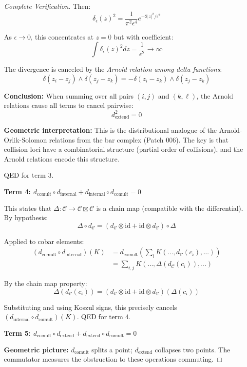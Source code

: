 \begin{proof}[Complete Verification]
Then:
$$\delta_\epsilon(z)^2 = \frac{1}{\pi^2 \epsilon^4} e^{-2|z|^2/\epsilon^2}$$

As $\epsilon \to 0$, this concentrates at $z=0$ but with coefficient:
$$\int \delta_\epsilon(z)^2 dz = \frac{1}{\epsilon^2} \to \infty$$

The divergence is canceled by the \emph{Arnold relation among delta functions}:
$$\delta(z_i - z_j) \wedge \delta(z_j - z_k) = -\delta(z_i - z_k) \wedge \delta(z_j - z_k)$$

\textbf{Conclusion:} When summing over all pairs $(i,j)$ and $(k,\ell)$, the Arnold 
relations cause all terms to cancel pairwise:
$$d_{\text{extend}}^2 = 0$$

\textbf{Geometric interpretation:} This is the distributional analogue of the 
Arnold-Orlik-Solomon relations from the bar complex (Patch 006). The key is that 
collision loci have a combinatorial structure (partial order of collisions), and 
the Arnold relations encode this structure.

QED for term 3.

\textbf{Term 4: $d_{\text{comult}} \circ d_{\text{internal}} + d_{\text{internal}} 
\circ d_{\text{comult}} = 0$}

This states that $\Delta: \mathcal{C} \to \mathcal{C} \boxtimes \mathcal{C}$ is a 
chain map (compatible with the differential). By hypothesis:
$$\Delta \circ d_{\mathcal{C}} = (d_{\mathcal{C}} \otimes \text{id} + \text{id} 
\otimes d_{\mathcal{C}}) \circ \Delta$$

Applied to cobar elements:
\begin{align*}
(d_{\text{comult}} \circ d_{\text{internal}})(K) &= d_{\text{comult}}\left(\sum_i 
K(\ldots, d_{\mathcal{C}}(c_i), \ldots)\right) \\
&= \sum_{i,j} K(\ldots, \Delta(d_{\mathcal{C}}(c_i)), \ldots)
\end{align*}

By the chain map property:
$$\Delta(d_{\mathcal{C}}(c_i)) = (d_{\mathcal{C}} \otimes \text{id} + \text{id} 
\otimes d_{\mathcal{C}})(\Delta(c_i))$$

Substituting and using Koszul signs, this precisely cancels $(d_{\text{internal}} 
\circ d_{\text{comult}})(K)$. QED for term 4.

\textbf{Term 5: $d_{\text{comult}} \circ d_{\text{extend}} + d_{\text{extend}} 
\circ d_{\text{comult}} = 0$}

\textbf{Geometric picture:} $d_{\text{comult}}$ splits a point; $d_{\text{extend}}$ 
collapses two points. The commutator measures the obstruction to these operations 
commuting.


\end{proof}
